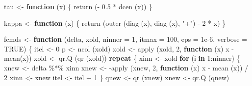 \documentclass[
  12pt,
  letterpaper,
  DIV=11,
  numbers=noendperiod]{scrreprt}
\newenvironment{Shaded}{\begin{snugshade}}{\end{snugshade}}
\newcommand{\AttributeTok}[1]{\textcolor[rgb]{0.40,0.45,0.13}{#1}}
\newcommand{\ConstantTok}[1]{\textcolor[rgb]{0.56,0.35,0.01}{#1}}
\newcommand{\ControlFlowTok}[1]{\textcolor[rgb]{0.00,0.23,0.31}{\textbf{#1}}}
\newcommand{\DecValTok}[1]{\textcolor[rgb]{0.68,0.00,0.00}{#1}}
\newcommand{\FloatTok}[1]{\textcolor[rgb]{0.68,0.00,0.00}{#1}}
\newcommand{\FunctionTok}[1]{\textcolor[rgb]{0.28,0.35,0.67}{#1}}
\newcommand{\NormalTok}[1]{\textcolor[rgb]{0.00,0.23,0.31}{#1}}
\newcommand{\OtherTok}[1]{\textcolor[rgb]{0.00,0.23,0.31}{#1}}
\newcommand{\SpecialCharTok}[1]{\textcolor[rgb]{0.37,0.37,0.37}{#1}}
\newcommand{\StringTok}[1]{\textcolor[rgb]{0.13,0.47,0.30}{#1}}
\theoremstyle{remark}
\begin{document}
\begin{Shaded}
\begin{Highlighting}[]
\NormalTok{tau }\OtherTok{\textless{}{-}} \ControlFlowTok{function}\NormalTok{ (x) \{}
  \FunctionTok{return}\NormalTok{ (}\SpecialCharTok{{-}} \FloatTok{0.5} \SpecialCharTok{*} \FunctionTok{dcen}\NormalTok{ (x))}
\NormalTok{\}}

\NormalTok{kappa }\OtherTok{\textless{}{-}} \ControlFlowTok{function}\NormalTok{ (x) \{}
  \FunctionTok{return}\NormalTok{ (}\FunctionTok{outer}\NormalTok{ (}\FunctionTok{diag}\NormalTok{ (x), }\FunctionTok{diag}\NormalTok{ (x), }\StringTok{"+"}\NormalTok{) }\SpecialCharTok{{-}} \DecValTok{2} \SpecialCharTok{*}\NormalTok{ x)}
\NormalTok{\}}

\NormalTok{fcmds }\OtherTok{\textless{}{-}}
  \ControlFlowTok{function}\NormalTok{ (delta,}
\NormalTok{            xold,}
            \AttributeTok{ninner =} \DecValTok{1}\NormalTok{,}
            \AttributeTok{itmax =} \DecValTok{100}\NormalTok{,}
            \AttributeTok{eps =} \FloatTok{1e{-}6}\NormalTok{,}
            \AttributeTok{verbose =} \ConstantTok{TRUE}\NormalTok{) \{}
\NormalTok{    itel }\OtherTok{\textless{}{-}} \DecValTok{0}
\NormalTok{    p }\OtherTok{\textless{}{-}} \FunctionTok{ncol}\NormalTok{ (xold)}
\NormalTok{    xold }\OtherTok{\textless{}{-}} \FunctionTok{apply}\NormalTok{ (xold, }\DecValTok{2}\NormalTok{, }\ControlFlowTok{function}\NormalTok{ (x)}
\NormalTok{      x }\SpecialCharTok{{-}} \FunctionTok{mean}\NormalTok{(x))}
\NormalTok{    xold }\OtherTok{\textless{}{-}} \FunctionTok{qr.Q}\NormalTok{ (}\FunctionTok{qr}\NormalTok{ (xold))}
    \ControlFlowTok{repeat}\NormalTok{ \{}
\NormalTok{      xinn }\OtherTok{\textless{}{-}}\NormalTok{ xold}
      \ControlFlowTok{for}\NormalTok{ (i }\ControlFlowTok{in} \DecValTok{1}\SpecialCharTok{:}\NormalTok{ninner) \{}
\NormalTok{        xnew }\OtherTok{\textless{}{-}}\NormalTok{ delta }\SpecialCharTok{\%*\%}\NormalTok{ xinn}
\NormalTok{        xnew }\OtherTok{\textless{}{-}} \SpecialCharTok{{-}}\FunctionTok{apply}\NormalTok{ (xnew, }\DecValTok{2}\NormalTok{, }\ControlFlowTok{function}\NormalTok{ (x)}
\NormalTok{          x }\SpecialCharTok{{-}} \FunctionTok{mean}\NormalTok{ (x)) }\SpecialCharTok{/} \DecValTok{2}
\NormalTok{        xinn }\OtherTok{\textless{}{-}}\NormalTok{ xnew}
\NormalTok{        itel }\OtherTok{\textless{}{-}}\NormalTok{ itel }\SpecialCharTok{+} \DecValTok{1}
\NormalTok{      \}}
\NormalTok{      qnew }\OtherTok{\textless{}{-}} \FunctionTok{qr}\NormalTok{ (xnew)}
\NormalTok{      xnew }\OtherTok{\textless{}{-}} \FunctionTok{qr.Q}\NormalTok{ (qnew)}

\end{Highlighting}
\end{Shaded}
\end{document}
